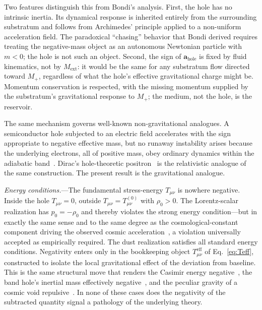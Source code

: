 \documentclass[%
  reprint,
  superscriptaddress,
  amsmath,amssymb,
  prl,
  floatfix,
  x11names
]{revtex4-2}
\begin{document}
Two features distinguish this from Bondi's analysis. First, the hole has no intrinsic inertia. Its dynamical response is inherited entirely from the surrounding substratum and follows from Archimedes' principle applied to a non-uniform acceleration field. The paradoxical ``chasing'' behavior that Bondi derived requires treating the negative-mass object as an autonomous Newtonian particle with $m<0$; the hole is not such an object. Second, the sign of $\mathbf{a}_{\text{hole}}$ is fixed by fluid kinematics, not by $M_{\text{ext}}$: it would be the same for any substratum flow directed toward $M_+$, regardless of what the hole's effective gravitational charge might be. Momentum conservation is respected, with the missing momentum supplied by the substratum's gravitational response to $M_+$; the medium, not the hole, is the reservoir.

The same mechanism governs well-known non-gravitational analogues. A semiconductor hole subjected to an electric field accelerates with the sign appropriate to negative effective mass, but no runaway instability arises because the underlying electrons, all of positive mass, obey ordinary dynamics within the adiabatic band~\cite{kittel-ssp,ashcroft-mermin}. Dirac's hole-theoretic positron~\cite{dirac-1930} is the relativistic analogue of the same construction. The present result is the gravitational analogue.

\textit{Energy conditions.}---The fundamental stress-energy $T_{\mu\nu}$ is nowhere negative. Inside the hole $T_{\mu\nu}=0$, outside $T_{\mu\nu}=T^{(0)}_{\mu\nu}$ with $\rho_0>0$. The Lorentz-scalar realization has $p_0=-\rho_0$ and thereby violates the strong energy condition---but in exactly the same sense and to the same degree as the cosmological-constant component driving the observed cosmic acceleration~\cite{Riess1998,Perlmutter1999}, a violation universally accepted as empirically required. The dust realization satisfies all standard energy conditions. Negativity enters only in the bookkeeping object $T^{\text{eff}}_{\mu\nu}$ of Eq.~\eqref{eq:Teff}, constructed to isolate the local gravitational effect of the deviation from baseline. This is the same structural move that renders the Casimir energy negative~\cite{casimir-1948,milton-2001}, the band hole's inertial mass effectively negative~\cite{kittel-ssp}, and the peculiar gravity of a cosmic void repulsive~\cite{shethvdw-2004,hamaus-2014}. In none of these cases does the negativity of the subtracted quantity signal a pathology of the underlying theory.
\end{document}
